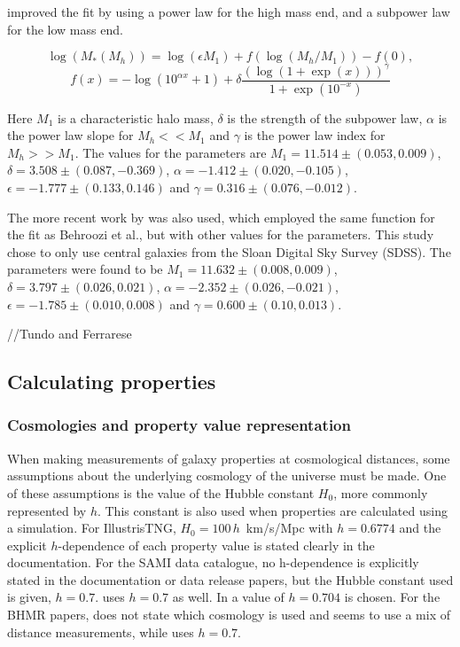 \cite{Behroozi2013} improved the fit by using a power law for the high mass end, and a subpower law for the low mass end.

\begin{equation} \label{eq_behroozi}
    \log(M_*(M_h)) = \log(\epsilon M_1) + f(\log(M_h/M_1)) -f(0),
\end{equation}
\begin{equation*}
    f(x) = -\log(10^{\alpha x}+1)+\delta \frac{(\log(1+\exp(x)))^\gamma}{1 +\exp(10^{-x})}
\end{equation*}

Here $M_1$ is a characteristic halo mass, $\delta$ is the strength of the subpower law, $\alpha$ is the power law slope for $M_h << M_1$ and $\gamma$ is the power law index for $M_h >> M_1$. The values for the parameters are $M_1 = 11.514\pm(0.053, 0.009)$, $\delta = 3.508 \pm (0.087, -0.369)$, $\alpha = -1.412 \pm (0.020, -0.105)$, $\epsilon = -1.777 \pm (0.133, 0.146)$ and $\gamma = 0.316 \pm (0.076, -0.012)$.

The more recent work by \cite{Zanisi2019} was also used, which employed the same function for the fit as Behroozi et al., but with other values for the parameters. This study chose to only use central galaxies from the Sloan Digital Sky Survey (SDSS). The parameters were found to be $M_1 = 11.632\pm(0.008, 0.009)$, $\delta = 3.797 \pm (0.026, 0.021)$, $\alpha = -2.352 \pm (0.026, -0.021)$, $\epsilon = -1.785 \pm (0.010, 0.008)$  and $\gamma = 0.600 \pm (0.10, 0.013)$.


//Tundo and Ferrarese

\subsection{Calculating properties}

\subsubsection{Cosmologies and property value representation} \label{cosmologies}
When making measurements of galaxy properties at cosmological distances, some assumptions about the underlying cosmology of the universe must be made. One of these assumptions is the value of the Hubble constant $H_0$, more commonly represented by $h$. This constant is also used when properties are calculated using a simulation. For IllustrisTNG, $H_0 = 100\,h\,$ km/s/Mpc with $ h = 0.6774$ and the explicit $h$-dependence of each property value is stated clearly in the documentation. For the SAMI data catalogue, no h-dependence is explicitly stated in the documentation or data release papers, but the Hubble constant used is given, $h = 0.7$.
\cite{Behroozi2013} uses $h = 0.7$ as well. In \cite{Moster2012} a value of $h = 0.704$ is chosen. For the BHMR papers, \cite{Ferrarese2000} does not state which cosmology is used and seems to use a mix of distance measurements, while \cite{Tundo2007} uses $h = 0.7$.

